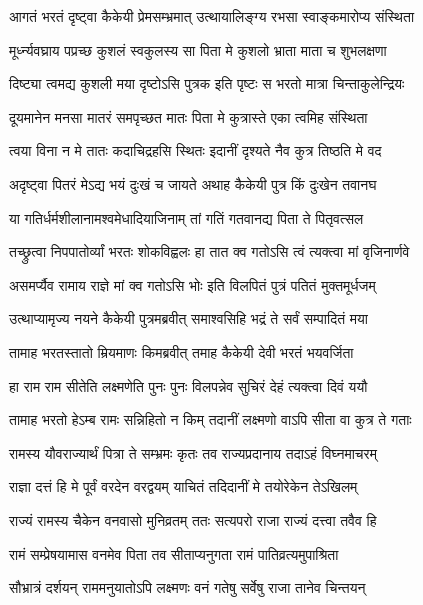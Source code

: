 \twolineshloka
{आगतं भरतं दृष्ट्वा कैकेयी प्रेमसम्भ्रमात्}
{उत्थायालिङ्ग्य रभसा स्वाङ्कमारोप्य संस्थिता} %

\twolineshloka
{मूर्ध्न्यवघ्राय पप्रच्छ कुशलं स्वकुलस्य सा}
{पिता मे कुशलो भ्राता माता च शुभलक्षणा} %

\twolineshloka
{दिष्ट्या त्वमद्य कुशली मया दृष्टोऽसि पुत्रक}
{इति पृष्टः स भरतो मात्रा चिन्ताकुलेन्द्रियः} %

\twolineshloka
{दूयमानेन मनसा मातरं समपृच्छत}
{मातः पिता मे कुत्रास्ते एका त्वमिह संस्थिता} %

\twolineshloka
{त्वया विना न मे तातः कदाचिद्रहसि स्थितः}
{इदानीं दृश्यते नैव कुत्र तिष्ठति मे वद} %

\twolineshloka
{अदृष्ट्वा पितरं मेऽद्य भयं दुःखं च जायते}
{अथाह कैकेयी पुत्र किं दुःखेन तवानघ} %

\twolineshloka
{या गतिर्धर्मशीलानामश्वमेधादियाजिनाम्}
{तां गतिं गतवानद्य पिता ते पितृवत्सल} %

\twolineshloka
{तच्छ्रुत्वा निपपातोर्व्यां भरतः शोकविह्वलः}
{हा तात क्व गतोऽसि त्वं त्यक्त्वा मां वृजिनार्णवे} %

\twolineshloka
{असमर्प्यैव रामाय राज्ञे मां क्व गतोऽसि भोः}
{इति विलपितं पुत्रं पतितं मुक्तमूर्धजम्} %

\twolineshloka
{उत्थाप्यामृज्य नयने कैकेयी पुत्रमब्रवीत्}
{समाश्वसिहि भद्रं ते सर्वं सम्पादितं मया} %

\twolineshloka
{तामाह भरतस्तातो म्रियमाणः किमब्रवीत्}
{तमाह कैकेयी देवी भरतं भयवर्जिता} %

\twolineshloka
{हा राम राम सीतेति लक्ष्मणेति पुनः पुनः}
{विलपन्नेव सुचिरं देहं त्यक्त्वा दिवं ययौ} %

\twolineshloka
{तामाह भरतो हेऽम्ब रामः सन्निहितो न किम्}
{तदानीं लक्ष्मणो वाऽपि सीता वा कुत्र ते गताः} %

\twolineshloka
{रामस्य यौवराज्यार्थं पित्रा ते सम्भ्रमः कृतः}
{तव राज्यप्रदानाय तदाऽहं विघ्नमाचरम्} %

\twolineshloka
{राज्ञा दत्तं हि मे पूर्वं वरदेन वरद्वयम्}
{याचितं तदिदानीं मे तयोरेकेन तेऽखिलम्} %

\twolineshloka
{राज्यं रामस्य चैकेन वनवासो मुनिव्रतम्}
{ततः सत्यपरो राजा राज्यं दत्त्वा तवैव हि} %

\twolineshloka
{रामं सम्प्रेषयामास वनमेव पिता तव}
{सीताप्यनुगता रामं पातिव्रत्यमुपाश्रिता} %

\twolineshloka
{सौभ्रात्रं दर्शयन् राममनुयातोऽपि लक्ष्मणः}
{वनं गतेषु सर्वेषु राजा तानेव चिन्तयन्} %

